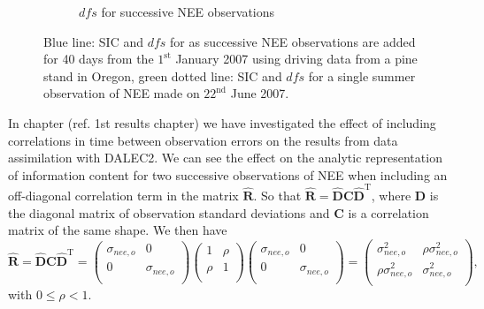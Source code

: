 \documentclass[11pt]{article}
\begin{document}
\begin{figure}[ht]
\begin{subfigure}[b]{0.45\textwidth}
        \caption{\(dfs\) for successive NEE observations}
        \label{fig:dfs_succ_nee}
    \end{subfigure}
    \caption{Blue line: SIC and \(dfs\) for as successive NEE observations are added for 40 days from the \(1^{\text{st}}\) January 2007 using driving data from a pine stand in Oregon, green dotted line: SIC and \(dfs\) for a single summer observation of NEE made on \( 22^{\text{nd}} \) June 2007. }
    \label{fig:ic_succ_nee}
\end{figure}

In chapter ({\color{red}ref. 1st results chapter}) we have investigated the effect of including correlations in time between observation errors on the results from data assimilation with DALEC2. We can see the effect on the analytic representation of information content for two successive observations of NEE when including an off-diagonal correlation term in the matrix \(\hat{\mathbf{R}}\). So that \(\hat{\mathbf{R}} = \hat{\mathbf{D}}\mathbf{C}\hat{\mathbf{D}}^{\text{T}}\), where \(\hat{\mathbf{D}}\) is the diagonal matrix of observation standard deviations and \(\mathbf{C}\) is a correlation matrix of the same shape. We then have
\begin{equation}
\hat{\mathbf{R}} =  \hat{\mathbf{D}}\mathbf{C}\hat{\mathbf{D}}^{\text{T}} =
\begin{pmatrix}
\sigma_{nee,o} & 0  \\
0 & \sigma_{nee,o}  \\
\end{pmatrix}
\begin{pmatrix}
1 & \rho  \\
\rho & 1  \\
\end{pmatrix}
\begin{pmatrix}
\sigma_{nee,o} & 0  \\
0 & \sigma_{nee,o}  \\
\end{pmatrix}
=
\begin{pmatrix}
\sigma_{nee,o}^{2} & \rho\sigma_{nee,o}^{2}  \\
\rho\sigma_{nee,o}^{2} & \sigma_{nee,o}^{2}  \\
\end{pmatrix},
\end{equation}
with \(0 \leq \rho < 1\).
\end{document}

